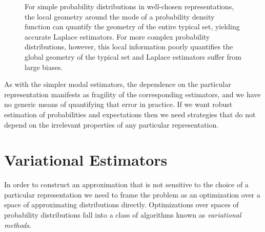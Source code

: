 \begin{figure*}
\centering
{}
\caption{For simple probability distributions in well-chosen
representations, the local geometry around the mode of a 
probability density function can quantify the geometry of the 
entire typical set, yielding accurate Laplace estimators. For
more complex probability distributions, however, this local
information poorly quantifies the global geometry of the 
typical set and Laplace estimators suffer from large biases.
}
\label{fig:laplace}
\end{figure*}

As with the simpler modal estimators, the dependence on the particular
representation manifests as fragility of the corresponding estimators,
and we have no generic means of quantifying that error in practice.  
If we want robust estimation of probabilities and expectations then we 
need strategies that do not depend on the irrelevant properties of any
particular representation.

\section{Variational Estimators}

In order to construct an approximation that is not sensitive to the choice 
of a particular representation we need to frame the problem as an 
optimization over a space of approximating distributions directly.
Optimizations over spaces of probability distributions fall into a class 
of algorithms known as \emph{variational methods}.

